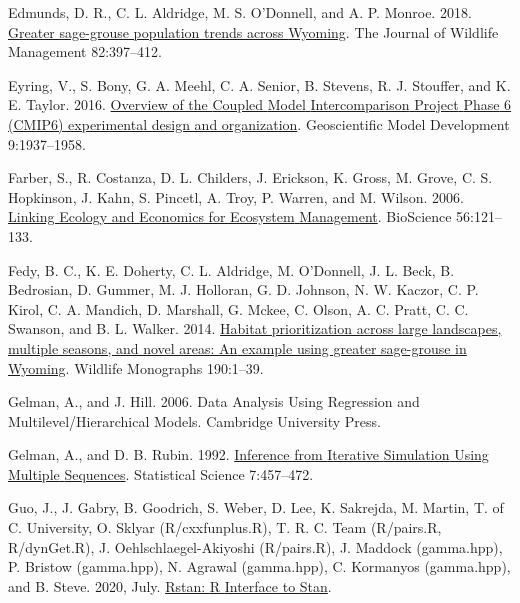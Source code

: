 \documentclass[
  12pt,
]{article}
\newlength{\cslhangindent}
\newlength{\cslentryspacingunit} %
\newenvironment{CSLReferences}[2] %
 {%
  \setlength{\parindent}{0pt}
  \ifodd #1
  \let\oldpar\par
  \def\par{\hangindent=\cslhangindent\oldpar}
  \fi
  \setlength{\parskip}{#2\cslentryspacingunit}
 }%
 {}
\begin{document}
\begin{CSLReferences}{1}{0}
\leavevmode{}%
Edmunds, D. R., C. L. Aldridge, M. S. O'Donnell, and A. P. Monroe. 2018. \href{https://doi.org/10.1002/jwmg.21386}{Greater sage-grouse population trends across {Wyoming}}. The Journal of Wildlife Management 82:397--412.

\leavevmode{}%
Eyring, V., S. Bony, G. A. Meehl, C. A. Senior, B. Stevens, R. J. Stouffer, and K. E. Taylor. 2016. \href{https://doi.org/10.5194/gmd-9-1937-2016}{Overview of the {Coupled} {Model} {Intercomparison} {Project} {Phase} 6 ({CMIP6}) experimental design and organization}. Geoscientific Model Development 9:1937--1958.

\leavevmode{}%
Farber, S., R. Costanza, D. L. Childers, J. Erickson, K. Gross, M. Grove, C. S. Hopkinson, J. Kahn, S. Pincetl, A. Troy, P. Warren, and M. Wilson. 2006. \href{https://doi.org/10.1641/0006-3568(2006)056\%5B0121:LEAEFE\%5D2.0.CO;2}{Linking {Ecology} and {Economics} for {Ecosystem} {Management}}. BioScience 56:121--133.

\leavevmode{}%
Fedy, B. C., K. E. Doherty, C. L. Aldridge, M. O'Donnell, J. L. Beck, B. Bedrosian, D. Gummer, M. J. Holloran, G. D. Johnson, N. W. Kaczor, C. P. Kirol, C. A. Mandich, D. Marshall, G. Mckee, C. Olson, A. C. Pratt, C. C. Swanson, and B. L. Walker. 2014. \href{https://doi.org/10.1002/wmon.1014}{Habitat prioritization across large landscapes, multiple seasons, and novel areas: {An} example using greater sage-grouse in {Wyoming}}. Wildlife Monographs 190:1--39.

\leavevmode{}%
Gelman, A., and J. Hill. 2006. Data {Analysis} {Using} {Regression} and {Multilevel}/{Hierarchical} {Models}. Cambridge University Press.

\leavevmode{}%
Gelman, A., and D. B. Rubin. 1992. \href{https://doi.org/10.1214/ss/1177011136}{Inference from {Iterative} {Simulation} {Using} {Multiple} {Sequences}}. Statistical Science 7:457--472.

\leavevmode{}%
Guo, J., J. Gabry, B. Goodrich, S. Weber, D. Lee, K. Sakrejda, M. Martin, T. of C. University, O. Sklyar (R/cxxfunplus.R), T. R. C. Team (R/pairs.R, R/dynGet.R), J. Oehlschlaegel-Akiyoshi (R/pairs.R), J. Maddock (gamma.hpp), P. Bristow (gamma.hpp), N. Agrawal (gamma.hpp), C. Kormanyos (gamma.hpp), and B. Steve. 2020, July. \href{https://CRAN.R-project.org/package=rstan}{Rstan: {R} {Interface} to {Stan}}.


\end{CSLReferences}
\end{document}
